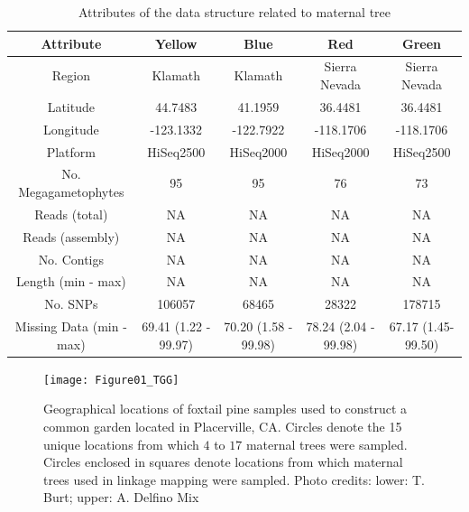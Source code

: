 \documentclass[11pt]{article}
\begin{document}
\clearpage

\singlespacing



\clearpage

\begin{table}[ht]
\centering
\begin{tabular}{ccccc}
\toprule
Attribute & Yellow & Blue & Red & Green\\
\midrule
Region & Klamath & Klamath & Sierra Nevada & Sierra Nevada \\
Latitude & 44.7483 & 41.1959 & 36.4481 & 36.4481 \\
Longitude & -123.1332 & -122.7922 & -118.1706 & -118.1706 \\
Platform & HiSeq2500 & HiSeq2000 & HiSeq2000 & HiSeq2500 \\
No. Megagametophytes & 95 & 95 & 76 & 73 \\
Reads (total) & NA & NA & NA & NA \\
Reads (assembly) & NA & NA & NA & NA \\
No. Contigs & NA & NA & NA & NA \\
Length (min - max) & NA & NA & NA & NA \\
No. SNPs & 106057 & 68465 & 28322 & 178715 \\
Missing Data (min - max) & 69.41 (1.22 - 99.97) & 70.20 (1.58 - 99.98) & 78.24 (2.04 - 99.98) & 67.17 (1.45-99.50) \\
\bottomrule
\end{tabular}
\caption{Attributes of the data structure related to maternal tree} 
\label{t:label}
\end{table}

\begin{figure}[ht]
\centering
\texttt{[image: Figure01\_TGG]}
\caption{Geographical locations of foxtail pine samples used to construct a common garden located in Placerville, CA. Circles 
denote the 15 unique locations from which $4$ to $17$ maternal trees were sampled. Circles enclosed in squares denote 
locations from which maternal trees used in linkage mapping were sampled. Photo credits: lower: T. Burt; upper: A. Delfino Mix}
\label{f:Figure01_TGG}
\end{figure}
\end{document}
